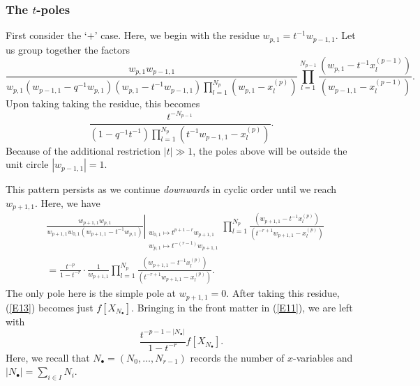 \documentclass{amsart}
\theoremstyle{remark}
\numberwithin{thm}{section}
\numberwithin{equation}{section}
\begin{document}
\subsubsection{The $t$-poles}\label{TPole1}
First consider the `$+$' case.
Here, we begin with the residue $w_{p,1}=t^{-1}w_{p-1,1}$.
Let us group together the factors
\[
\frac{w_{p,1}w_{p-1,1}}{w_{p,1}\left( w_{p-1,1}-q^{-1}w_{p,1} \right)\left( w_{p,1}-t^{-1}w_{p-1,1} \right)
\displaystyle
\prod_{l=1}^{N_p}\left( w_{p,1}-x_{l}^{(p)} \right)}
\prod_{l=1}^{N_{p-1}}\frac{\left( w_{p,1}-t^{-1}x_{l}^{(p-1)} \right)}
{\left( w_{p-1,1}-x_{l}^{(p-1)} \right)}.
\]
Upon taking taking the residue, this becomes
\[
\frac{t^{-N_{p-1}}}{\left(1-q^{-1}t^{-1}\right)
\displaystyle
\prod_{l=1}^{N_p}\left( t^{-1}w_{p-1,1}-x_{l}^{(p)} \right)}.
\]
Because of the additional restriction $|t|\gg 1$, the poles above will be outside the unit circle $|w_{p-1,1}|=1$.

This pattern persists as we continue \textit{downwards} in cyclic order until we reach $w_{p+1,1}$.
Here, we have
\begin{align*}
&\left.
\frac{w_{p+1,1}w_{p,1}}{w_{p+1,1}w_{0,1}
\left( w_{p+1,1}-t^{-1}w_{p,1} \right)}
\right|_{\substack{w_{0,1}\mapsto t^{p+1-r}w_{p+1,1}\\ w_{p,1}\mapsto t^{-(r-1)}w_{p+1,1}}}
\prod_{l=1}^{N_{p}}
\frac{\left( w_{p+1,1}-t^{-1}x_{l}^{(p)} \right)}
{\left( t^{-r+1}w_{p+1,1}-x_{l}^{(p)} \right)}\\
&= \frac{t^{-p}}{1-t^{-r}}
\cdot\frac{1}{w_{p+1,1}}\prod_{l=1}^{N_{p}}
\frac{\left( w_{p+1,1}-t^{-1}x_{l}^{(p)} \right)}
{\left( t^{-r+1}w_{p+1,1}-x_{l}^{(p)} \right)}.
\end{align*}
The only pole here is the simple pole at $w_{p+1,1}=0$.
After taking this residue, (\ref{E13}) becomes just $f\left[ X_{N_\bullet} \right]$.
Bringing in the front matter in (\ref{E11}), we are left with
\begin{equation*}
\frac{t^{-p-1-|N_\bullet|}}
{1- t^{-r } }
f\left[ X_{N_\bullet} \right].
\end{equation*}
Here, we recall that $N_\bullet=(N_0,\ldots, N_{r-1})$ records the number of $x$-variables and $|N_\bullet|=\sum_{i\in I}N_i$.
\end{document}
